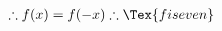 \documentclass[preview]{standalone}
\begin{document}
\begin{align*}
\therefore f(x)=f(-x) \therefore \Tex{f is even}
\end{align*}
\end{document}
